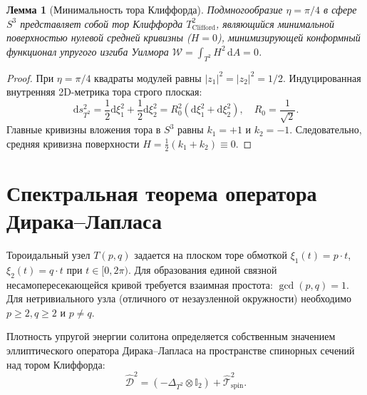\documentclass[11pt,a4paper]{article}
\newtheorem{lemma}[theorem]{Лемма}
\theoremstyle{definition}
\theoremstyle{remark}
\begin{document}
\begin{lemma}[Минимальность тора Клиффорда]
Подмногообразие $\eta = \pi/4$ в сфере $S^3$ представляет собой тор Клиффорда $T^2_{\mathrm{Clifford}}$, являющийся минимальной поверхностью нулевой средней кривизны ($H=0$), минимизирующей конформный функционал упругого изгиба Уилмора $\mathcal{W} = \int_{T^2} H^2 \, \mathrm{d}A = 0$.
\end{lemma}
\begin{proof}
При $\eta = \pi/4$ квадраты модулей равны $|z_1|^2 = |z_2|^2 = 1/2$. Индуцированная внутренняя 2D-метрика тора строго плоская:
\begin{equation}
    \mathrm{d}s^2_{T^2} = \frac{1}{2}\mathrm{d}\xi_1^2 + \frac{1}{2}\mathrm{d}\xi_2^2 = R_0^2 (\mathrm{d}\xi_1^2 + \mathrm{d}\xi_2^2), \quad R_0 = \frac{1}{\sqrt{2}}.
\end{equation}
Главные кривизны вложения тора в $S^3$ равны $k_1 = +1$ и $k_2 = -1$. Следовательно, средняя кривизна поверхности $H = \frac{1}{2}(k_1 + k_2) \equiv 0$.
\end{proof}

\section{Спектральная теорема оператора Дирака--Лапласа}
Тороидальный узел $T(p,q)$ задается на плоском торе обмоткой $\xi_1(t) = p \cdot t$, $\xi_2(t) = q \cdot t$ при $t \in [0, 2\pi)$. Для образования единой связной несамопересекающейся кривой требуется взаимная простота: $\gcd(p,q) = 1$. Для нетривиального узла (отличного от незаузленной окружности) необходимо $p \ge 2, q \ge 2$ и $p \ne q$.

Плотность упругой энергии солитона определяется собственным значением эллиптического оператора Дирака--Лапласа на пространстве спинорных сечений над тором Клиффорда:
\begin{equation}
    \hat{\mathcal{D}}^2 = \left( -\Delta_{T^2} \otimes \mathbb{I}_2 \right) + \hat{\mathcal{T}}_{\mathrm{spin}}^2.
\end{equation}
\end{document}
